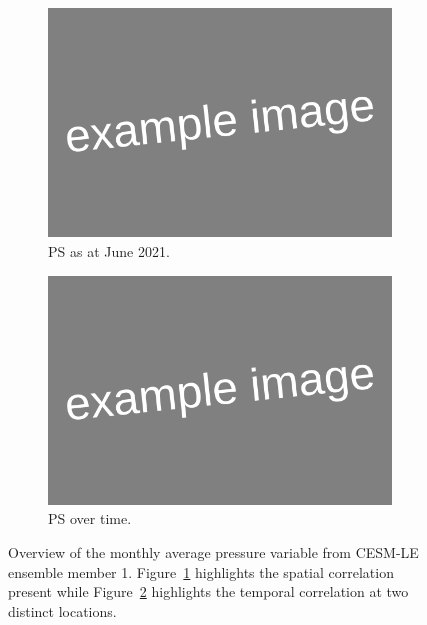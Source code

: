 \begin{figure}[htbp!] 
	\centering
	\begin{subfigure}[b]{0.45\textwidth}
		\includegraphics[width=\textwidth]{Example_image}
		\caption{PS as at June 2021.}
		\label{fig:pressure_june}   
	\end{subfigure}             
	\begin{subfigure}[b]{0.45\textwidth}
		\includegraphics[width=\textwidth]{Example_image}
		\caption{PS  over time.}
		\label{fig:pressure_temp}
	\end{subfigure}             
	\caption[Overview of Pressure variable]{Overview of the monthly average pressure variable from CESM-LE ensemble member 1. Figure~\ref{fig:pressure_june} highlights the spatial correlation present while Figure~\ref{fig:pressure_temp} highlights the temporal correlation at two distinct locations.}
	\label{fig:pressure_overview}
\end{figure}

